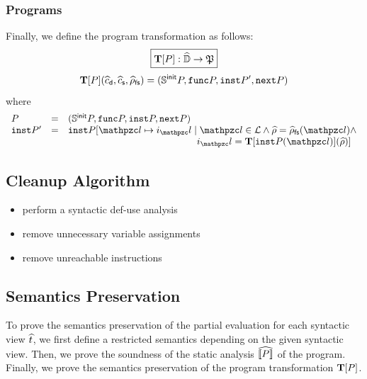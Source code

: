 \documentclass[10pt,conference]{IEEEtran}
\begin{document}
\subsubsection{Programs} Finally, we define the program transformation as follows:
\[
  \framebox{$\transform{\prog}: \aelemset \rightarrow \progset$}
\]
\[
  \transform{\prog}(\adcall, \ascall, \afsenv) = (\initstset{\prog},
  \getfunc{\prog}, \getinst{\prog'}, \getnext{\prog})
\]
where
\[
  \begin{array}{lcl}
    \prog &=&
    (\initstset{\prog}, \getfunc{\prog}, \getinst{\prog}, \getnext{\prog})\\

    \getinst{\prog'} &=&
    \getinst{\prog}[\lab \mapsto \inst_\lab \mid
    \lab \in \labset \wedge \aenv = \afsenv(\lab) \wedge\\&&

    \phantom{\getinst{\prog}[\lab \mapsto \inst_\lab \mid}
    \inst_\lab = \transform{\getinst{\prog}(\lab)}(\aenv)]\\
  \end{array}
\]



\subsection{Cleanup Algorithm}

\todo

\begin{itemize}
  \item perform a syntactic def-use analysis
  \item remove unnecessary variable assignments
  \item remove unreachable instructions
\end{itemize}


\subsection{Semantics Preservation}

To prove the semantics preservation of the partial evaluation for each syntactic
view $\widehat{t}$, we first define a restricted semantics depending on the given
syntactic view. Then, we prove the soundness of the static analysis
$\widehat{\llbracket{P}\rrbracket}$ of the program. Finally, we prove the semantics preservation of
the program transformation $\textbf{T}[P]$.
\end{document}

